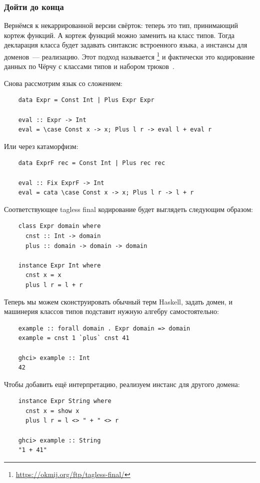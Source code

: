 \subsubsection{Дойти до конца}

Вернёмся к некаррированной версии свёрток: теперь это тип, принимающий кортеж функций.
А кортеж функций можно заменить на класс типов.
Тогда декларация класса будет задавать синтаксис встроенного языка, а инстансы для доменов~--- реализацию.
Этот подход называется \footnote{\url{https://okmij.org/ftp/tagless-final/}} и фактически это кодирование данных по Чёрчу с классами типов и набором трюков~\cite{carette2007finally, kiselyov2012typed}.

Снова рассмотрим язык со сложением:
\begin{verbatim}
    data Expr = Const Int | Plus Expr Expr

    eval :: Expr -> Int
    eval = \case Const x -> x; Plus l r -> eval l + eval r
\end{verbatim}
Или через катаморфизм:
\begin{verbatim}
    data ExprF rec = Const Int | Plus rec rec

    eval :: Fix ExprF -> Int
    eval = cata \case Const x -> x; Plus l r -> l + r
\end{verbatim}
Соответствующее tagless final кодирование будет выглядеть следующим образом:
\begin{verbatim}
    class Expr domain where
      cnst :: Int -> domain
      plus :: domain -> domain -> domain

    instance Expr Int where
      cnst x = x
      plus l r = l + r
\end{verbatim}

Теперь мы можем сконструировать обычный терм Haskell, задать домен, и машинерия классов типов подставит нужную алгебру самостоятельно:
\begin{verbatim}
    example :: forall domain . Expr domain => domain
    example = cnst 1 `plus` cnst 41

    ghci> example :: Int
    42
\end{verbatim}

Чтобы добавить ещё интерпретацию, реализуем инстанс для другого домена:
\begin{verbatim}
    instance Expr String where
      cnst x = show x
      plus l r = l <> " + " <> r

    ghci> example :: String
    "1 + 41"
\end{verbatim}

